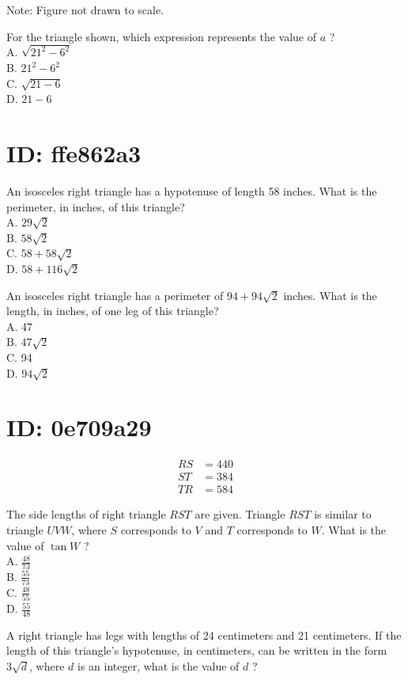 
Note: Figure not drawn to scale.

For the triangle shown, which expression represents the value of $a$ ?\\
A. $\sqrt{21^{2}-6^{2}}$\\
B. $21^{2}-6^{2}$\\
C. $\sqrt{21-6}$\\
D. $21-6$









\section*{ID: ffe862a3}
An isosceles right triangle has a hypotenuse of length 58 inches. What is the perimeter, in inches, of this triangle?\\
A. $29 \sqrt{2}$\\
B. $58 \sqrt{2}$\\
C. $58+58 \sqrt{2}$\\
D. $58+116 \sqrt{2}$

An isosceles right triangle has a perimeter of $94+94 \sqrt{2}$ inches. What is the length, in inches, of one leg of this triangle?\\
A. 47\\
B. $47 \sqrt{2}$\\
C. 94\\
D. $94 \sqrt{2}$

\section*{ID: 0e709a29}
$$
\begin{aligned}
R S & =440 \\
S T & =384 \\
T R & =584
\end{aligned}
$$

The side lengths of right triangle $R S T$ are given. Triangle $R S T$ is similar to triangle $U V W$, where $S$ corresponds to $V$ and $T$ corresponds to $W$. What is the value of $\tan W$ ?\\
A. $\frac{48}{73}$\\
B. $\frac{55}{73}$\\
C. $\frac{48}{55}$\\
D. $\frac{55}{48}$

A right triangle has legs with lengths of 24 centimeters and 21 centimeters. If the length of this triangle's hypotenuse, in centimeters, can be written in the form $3 \sqrt{d}$, where $d$ is an integer, what is the value of $d$ ?

